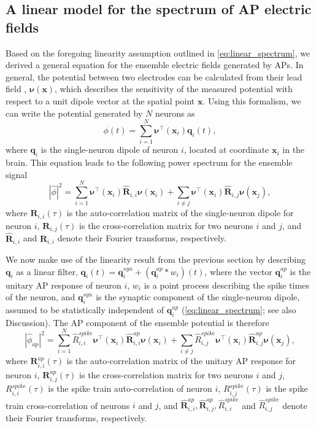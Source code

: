\subsection{A linear model for the spectrum of AP electric fields}
Based on the foregoing linearity assumption outlined in {\ref{eq:linear_spectrum}}, we derived a general equation for the ensemble electric fields generated by APs. In general, the potential between two electrodes can be calculated from their lead field \cite{Malmivuo1995}, $\bm{\nu}(\bm{x})$, which describes the sensitivity of the measured potential with respect to a unit dipole vector at the spatial point $\bm{x}$. Using this formalism, we can write the potential generated by $N$ neurons as 
\begin{equation}
    \phi(t) = \sum_{i=1}^N \bm{\nu}^\intercal(\bm{x}_i) \bm{q}_i(t)\mathrm{,}
\end{equation}
where $\bm{q}_i$ is the single-neuron dipole of neuron $i$, located at coordinate $\bm{x}_i$ in the brain. This equation leads to the following power spectrum for the ensemble signal
\begin{equation} \label{eq:apEEG_spectrum}
    |\hat{\phi}|^2 = \sum_{i=1}^N \bm{\nu}^\intercal(\bm{x}_i) \hat{\bm{R}}_{i,i} \bm{\nu}(\bm{x}_i) + \sum_{i\ne j} \bm{\nu}^\intercal(\bm{x}_i) \hat{\bm{R}}_{i,j}\bm{\nu}(\bm{x}_j)\mathrm{,}
\end{equation}
where $\bm{R}_{i,i}(\tau)$ is the auto-correlation matrix of the single-neuron dipole for neuron $i$, $\bm{R}_{i,j}(\tau)$ is the cross-correlation matrix for two neurons $i$ and $j$, and $\hat{\bm{R}}_{i,i}$ and $\hat{\bm{R}}_{i,i}$ denote their Fourier transforms, respectively.

We now make use of the linearity result from the previous section by describing $\bm{q}_i$ as a linear filter, $\bm{q}_i(t)=\bm{q}_i^{syn}+(\bm{q}^{ap}_i*w_i)(t)$, where the vector $\bm{q}^{ap}_i$ is the unitary AP response of neuron $i$, $w_i$ is a point process describing the spike times of the neuron, and $\bm{q}^{syn}_i$ is the synaptic component of the single-neuron dipole, assumed to be statistically independent of $\bm{q}^{ap}_i$ ({\ref{eq:linear_spectrum}}; see also Discussion). The AP component of the ensemble potential is therefore
\begin{equation} \label{eq:apEEG_spectrum2}
    |\hat{\phi}_{ap}|^2 = \sum_{i=1}^N \hat{R}_{i,i}^{spike} \bm{\nu}^\intercal(\bm{x}_i) \hat{\bm{R}}^{ap}_{i,i} \bm{\nu}(\bm{x}_i) + \sum_{i\ne j} \hat{R}^{spike}_{i,j}\bm{\nu}^\intercal(\bm{x}_i) \hat{\bm{R}}^{ap}_{i,j}\bm{\nu}(\bm{x}_j)\mathrm{,}
\end{equation}
where $\bm{R}^{ap}_{i,i}(\tau)$ is the auto-correlation matrix of the unitary AP response for neuron $i$, $\bm{R}^{ap}_{i,j}(\tau)$ is the cross-correlation matrix for two neurons $i$ and $j$, $R_{i,i}^{spike}(\tau)$ is the spike train auto-correlation of neuron $i$, $R_{i,j}^{spike}(\tau)$ is the spike train cross-correlation of neurons $i$ and $j$, and $\hat{\bm{R}}^{ap}_{i,i}, \hat{\bm{R}}^{ap}_{i,j}, \hat{R}_{i,i}^{spike}$ and $\hat{R}^{spike}_{i,j}$ denote their Fourier transforms, respectively.

